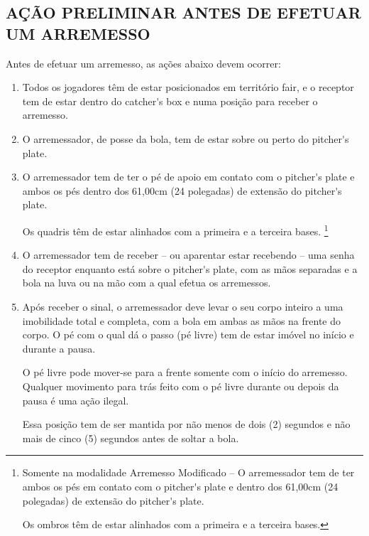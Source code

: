 \begin{multicols}{2}	
	
	\subsection{A\c{C}ÃO PRELIMINAR ANTES DE EFETUAR UM ARREMESSO }
	Antes de efetuar um arremesso, as a\c{c}\~oes abaixo devem ocorrer: 
	
	\begin{enumerate}[label=\alph*)]
		\item Todos os jogadores t\^em de estar posicionados em territ\'orio \gls{fair}, e o receptor tem de estar dentro do \gls{catcher's box} e numa posi\c{c}\~ao para receber o arremesso. 
		
		\item  O arremessador, de posse da bola, tem de estar sobre ou perto do \gls{pitcher's plate}. 
		
		\item  O arremessador tem de ter o p\'e de apoio em contato com o \gls{pitcher's plate} e 
		ambos os p\'es dentro dos 61,00cm (24 polegadas) de extens\~ao do \gls{pitcher's plate}. 
		
		Os quadris t\^em de estar alinhados com a primeira e a terceira bases. 
		\footnote{Somente na modalidade Arremesso Modificado -- O arremessador tem de ter ambos 
		os p\'es em contato com o \gls{pitcher's plate} e dentro dos 61,00cm (24 polegadas) de 
		extens\~ao do \gls{pitcher's plate}. 
	
		Os ombros t\^em de estar alinhados com a primeira e a terceira bases.}
		\item O arremessador tem de receber -- ou aparentar estar recebendo -- uma senha do 
		receptor enquanto est\'a sobre o \gls{pitcher's plate}, com as m\~aos separadas e a bola na 
		luva ou na m\~ao com a qual efetua os arremessos. 
		
		\item  Ap\'os receber o sinal, o arremessador deve levar o seu corpo inteiro a uma 
		imobilidade total e completa, com a bola em ambas as m\~aos na frente do corpo. O p\'e 
		com o qual d\'a o passo (p\'e livre) tem de estar im\'ovel no in\'icio e durante a pausa. 
		
		O p\'e livre pode mover-se para a frente somente com o in\'icio do arremesso. Qualquer 
		movimento para tr\'as feito com o p\'e livre durante ou depois da pausa \'e uma a\c{c}\~ao 
		ilegal. 
		
		Essa posi\c{c}\~ao tem de ser mantida por n\~ao menos de dois (2) segundos e n\~ao 
		mais de cinco (5) segundos antes de soltar a bola. 
		

\end{enumerate}
\end{multicols}
